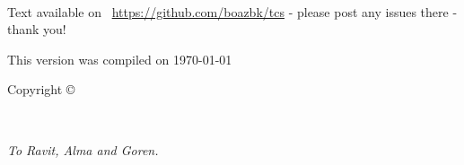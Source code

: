 \frontmatter


\maketitle



\newpage
\begin{fullwidth}
~\vfill
\thispagestyle{empty}
\setlength{\parindent}{0pt}
\setlength{\parskip}{\baselineskip}

Text available on \faGithub\  \url{https://github.com/boazbk/tcs} - please post any issues there - thank you!

This version was compiled on \today\ \currenttime

Copyright \copyright\ \the\year\ \thanklessauthor

\doclicenseThis



\end{fullwidth}



\cleardoublepage
\thispagestyle{empty}%
~\vfill
\begin{doublespace}
\noindent\fontsize{18}{22}\selectfont\itshape
\nohyphenation
To Ravit, Alma and Goren.
\end{doublespace}
\vfill
\vfill








\cleardoublepage

\setcounter{tocdepth}{1}
\setcounter{secnumdepth}{3}


\cleardoublepage
\setcounter{tocdepth}{3}
\tableofcontents


\cleardoublepage
